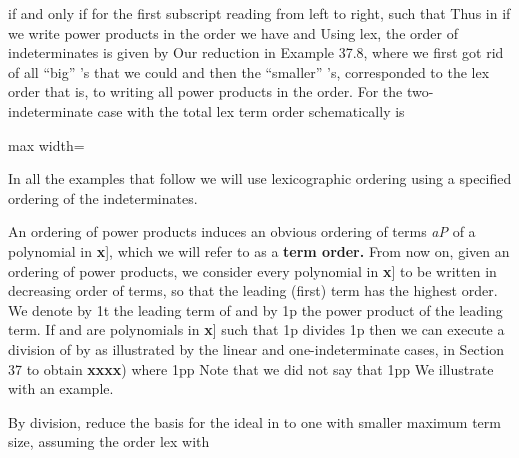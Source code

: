 \documentclass[11pt,oneside]{article}
\begin{document}
\begin{BookBody}
\noindent if and only if  for the first subscript  reading from left to right, such that  Thus in  if we write power products in the order  we have   and  Using lex, the order of  indeterminates is given by   Our reduction in Example 37.8, where we first got rid of all “big” ’s that we could and then the “smaller” ’s, corresponded to the lex order  that is, to writing all power products in the  order. For the two-indeterminate case with  the total lex term order schematically is

\begin{center}\begin{adjustbox}{max width=\linewidth}\end{adjustbox}\end{center}

\noindent In all the examples that follow we will use lexicographic ordering using a specified ordering of the indeterminates.

An ordering of power products  induces an obvious ordering of terms\textit{ aP} of a polynomial in \BookInline{F[}\textbf{x}], which we will refer to as a\textbf{ term order.} From now on, given an ordering of power products, we consider every polynomial  in \BookInline{F[}\textbf{x}] to be written in decreasing order of terms, so that the leading (first) term has the highest order. We denote by 1t the leading term of  and by 1p the power product of the leading term. If  and  are polynomials in \BookInline{F[}\textbf{x}] such that 1p divides 1p then we can execute a division of  by  as illustrated by the linear and one-indeterminate cases, in Section 37 to obtain \textbf{x}\textbf{x}\textbf{x}\textbf{x}) where 1pp Note that we did not say that 1pp We illustrate with an example.

 By division, reduce the basis  for the ideal  in  to one with smaller maximum term size, assuming the order lex with 

\end{BookBody}
\end{document}
